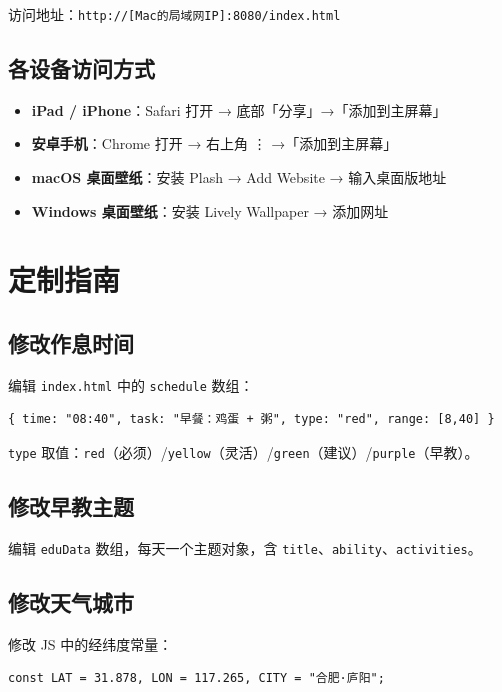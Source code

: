 \documentclass[12pt,a4paper,fontset=fandol]{ctexart}
\begin{document}
访问地址：\texttt{http://[Mac的局域网IP]:8080/index.html}

\subsection{各设备访问方式}

\begin{itemize}
    \item \textbf{iPad / iPhone}：Safari 打开 → 底部「分享」→「添加到主屏幕」
    \item \textbf{安卓手机}：Chrome 打开 → 右上角 ⋮ →「添加到主屏幕」
    \item \textbf{macOS 桌面壁纸}：安装 Plash → Add Website → 输入桌面版地址
    \item \textbf{Windows 桌面壁纸}：安装 Lively Wallpaper → 添加网址
\end{itemize}

\section{定制指南}

\subsection{修改作息时间}

编辑 \texttt{index.html} 中的 \texttt{schedule} 数组：

\begin{lstlisting}[basicstyle=\ttfamily\small]
{ time: "08:40", task: "早餐：鸡蛋 + 粥", type: "red", range: [8,40] }
\end{lstlisting}

\texttt{type} 取值：\texttt{red}（必须）/\texttt{yellow}（灵活）/\texttt{green}（建议）/\texttt{purple}（早教）。

\subsection{修改早教主题}

编辑 \texttt{eduData} 数组，每天一个主题对象，含 \texttt{title}、\texttt{ability}、\texttt{activities}。

\subsection{修改天气城市}

修改 JS 中的经纬度常量：

\begin{lstlisting}[basicstyle=\ttfamily\small]
const LAT = 31.878, LON = 117.265, CITY = "合肥·庐阳";
\end{lstlisting}
\end{document}

